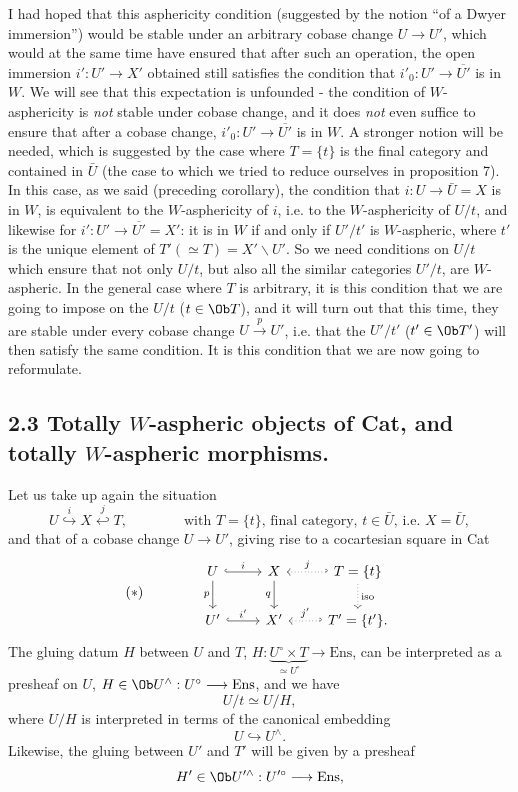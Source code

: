 I had hoped that this asphericity condition (suggested by the notion ``of a Dwyer immersion'') would be stable under an arbitrary cobase change $U\longrightarrow U'$, which would at the same time have ensured that after such an operation, the open immersion $i':U'\longrightarrow X'$ obtained still satisfies the condition that $i'_0:U'\longrightarrow\overline{U'}$ is in $W$. We will see that this expectation is unfounded - the condition of $W$-asphericity is \textit{not} stable under cobase change, and it does \textit{not} even suffice to ensure that after a cobase change, $i'_0:U'\longrightarrow\overline{U'}$ is
in $W$. A stronger notion will be needed, which is suggested by the case where $T=\{t\}$ is the final category and contained in $\bar U$ (the case to which we tried to reduce ourselves in proposition 7). In this case, as we said (preceding corollary), the condition that $i:U\longrightarrow\bar U=X$ is in $W$, is equivalent to the $W$-asphericity of $i$, i.e. to the $W$-asphericity of $U/t$, and likewise for $i':U'\longrightarrow\overline{U'}=X'$: it is in $W$ if and only if $U'/t'$ is $W$-aspheric, where
$t'$ is the unique element of $T'(\simeq T)=X'\backslash U'$. So we need conditions on $U/t$ which ensure that not only $U/t$, but also all the similar categories $U'/t$, are $W$-aspheric. In the general case where $T$ is arbitrary, it is this condition that we are going to impose on the $U/t$ ($t\in\Ob T$), and it will turn out that this time, they are stable under every cobase change $U\xrightarrow{p}U'$, i.e. that the $U'/t'$ ($t'\in\Ob T'$) will then satisfy the same condition. It is this condition that we are now going to reformulate.

\subsection*{2.3 Totally $W$-aspheric objects of \textnormal{Cat}, and totally $W$-aspheric morphisms.}

Let us take up again the situation
\[
U\overset{i}{\hookrightarrow}X\overset{j}{\hookleftarrow}T,\qquad\qquad\text{with }T=\{t\}\text{, final category, }t\in\bar U\text{, i.e. }X=\bar U,
\]
and that of a cobase change $U\longrightarrow U'$, giving rise to a cocartesian square in Cat
\[
(*)\qquad\qquad
\begin{tikzcd}
U \arrow[r, hook, "i"] \arrow[d, "p"'] & X \arrow[d, "q"'] & T=\{t\} \arrow[l, hook', dotted, "j"'] \arrow[d, dotted, "\mathrm{iso}"] \\
U' \arrow[r, hook, "i'"] & X' & T'=\{t'\}. \arrow[l, hook', dotted, "j'"']
\end{tikzcd}
\]
The gluing datum $H$ between $U$ and $T$, $H:\underbrace{U^\circ\times T}_{\simeq U^\circ}\longrightarrow\mathrm{Ens}$, can be interpreted as a presheaf on $U$, $H\in\Ob U^\wedge:U^\circ\longrightarrow\mathrm{Ens}$,
and we have
\[
U/t\simeq U/H,
\]
where $U/H$ is interpreted in terms of the canonical embedding
\[
U\hookrightarrow U^\wedge.
\]
Likewise, the gluing between $U'$ and $T'$ will be given by a presheaf
\[
H'\in\Ob U^{\prime\wedge}:U^{\prime\circ}\longrightarrow\mathrm{Ens},
\]